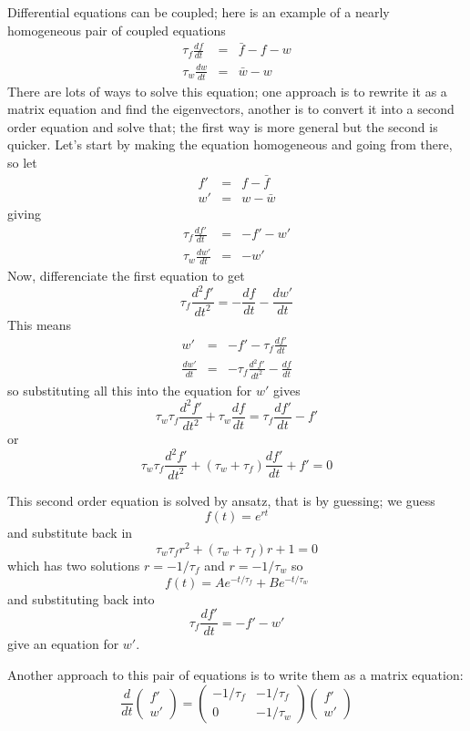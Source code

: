 \documentclass{article}
\begin{document}
Differential equations can be coupled; here is an example of a nearly homogeneous pair of coupled equations
\begin{eqnarray}
\tau_f \frac{df}{dt}&=&\bar{f}-f-w\\
\tau_w \frac{dw}{dt}&=&\bar{w}-w
\end{eqnarray}
There are lots of ways to solve this equation; one approach is to rewrite it as a matrix equation and find the eigenvectors, another is to convert it into a second  order equation and solve that; the first way is more general but the second is quicker. Let's start by making the equation homogeneous and going from there, so
let
\begin{eqnarray}
f'&=&f-\bar{f}\\
w'&=&w-\bar{w}
\end{eqnarray}
giving
\begin{eqnarray}
\tau_f \frac{df'}{dt}&=&-f'-w'\\
\tau_w \frac{dw'}{dt}&=&-w'
\end{eqnarray}
Now, differenciate the first equation to get
\begin{equation}
\tau_f \frac{d^2f'}{dt^2}=-\frac{df}{dt}-\frac{dw'}{dt}
\end{equation}
This means
\begin{eqnarray}
w'&=&-f'-\tau_f \frac{df'}{dt}\\
\frac{dw'}{dt}&=&-\tau_f \frac{d^2f'}{dt^2}-\frac{df}{dt}
\end{eqnarray}
so substituting all this into the equation for $w'$ gives
\begin{equation}
\tau_w\tau_f \frac{d^2f'}{dt^2}+\tau_w\frac{df}{dt}=\tau_f\frac{df'}{dt}-f'
\end{equation}
or
\begin{equation}
\tau_w\tau_f \frac{d^2f'}{dt^2}+(\tau_w+\tau_f)\frac{df'}{dt}+f'=0
\end{equation}

This second order equation is solved by ansatz, that is by guessing; we guess
\begin{equation}
f(t)=e^{rt}
\end{equation}
and substitute back in
\begin{equation}
\tau_w\tau_f r^2+(\tau_w+\tau_f)r+1=0
\end{equation}
which has two solutions $r=-1/\tau_f$ and $r=-1/\tau_w$ so
\begin{equation}
f(t)=Ae^{-t/\tau_f}+Be^{-t/\tau_w}
\end{equation}
and substituting back into 
\begin{equation}
\tau_f \frac{df'}{dt}=-f'-w'
\end{equation}
give an equation for $w'$.

Another approach to this pair of equations is to write them as a
matrix equation:
\begin{equation}
\frac{d}{dt}\left(\begin{array}{c}f'\\w'\end{array}\right)
=\left(\begin{array}{cc}-1/\tau_f&-1/\tau_f\\0&-1/\tau_w\end{array}\right)
\left(\begin{array}{c}f'\\w'\end{array}\right)
\end{equation}
\end{document}
